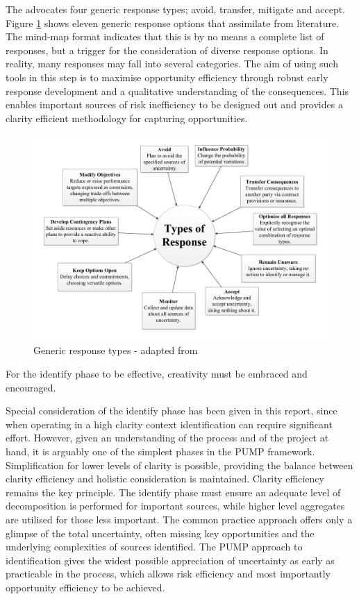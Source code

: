 The \citet{pmi2013} advocates four generic response types; avoid, transfer, mitigate and accept.
Figure \ref{Figure:ResponseTypes} shows eleven generic response options that \citet{chapman} assimilate from literature.
The mind-map format indicates that this is by no means a complete list of responses, but a trigger for the consideration of diverse response options.
In reality, many responses may fall into several categories.
The aim of using such tools in this step is to maximise opportunity efficiency through robust early response development and a qualitative understanding of the consequences. 
This enables important sources of risk inefficiency to be designed out and provides a clarity efficient methodology for capturing opportunities.

\begin{figure}[!h]
  \centering
    \includegraphics[width = \textwidth]{./Figures/ResponseTypes.pdf} 
\caption{Generic response types - adapted from \cite{chapman}}
\label{Figure:ResponseTypes}
\end{figure}

For the identify phase to be effective, creativity must be embraced and encouraged.


Special consideration of the identify phase has been given in this report, since when operating in a high clarity context identification can require significant effort.
However, given an understanding of the process and of the project at hand, it is arguably one of the simplest phases in the PUMP framework.
Simplification for lower levels of clarity is possible, providing the balance between clarity efficiency and holistic consideration is maintained.
Clarity efficiency remains the key principle.
The identify phase must ensure an adequate level of decomposition is performed for important sources, while higher level aggregates are utilised for those less important.
The common practice approach offers only a glimpse of the total uncertainty, often missing key opportunities and the underlying complexities of sources identified.
The PUMP approach to identification gives the widest possible appreciation of uncertainty as early as practicable in the process, which allows risk efficiency and most importantly opportunity efficiency to be achieved.









